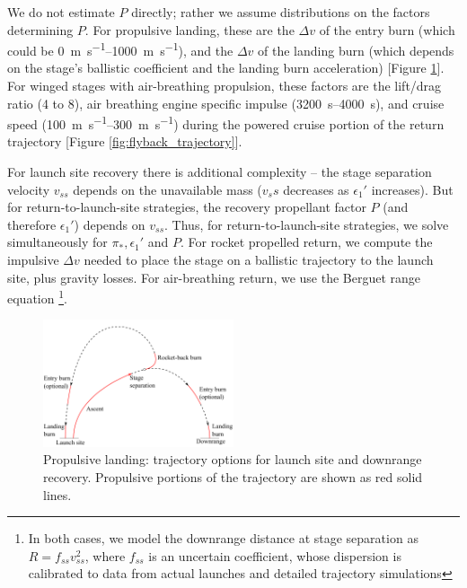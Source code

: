 \documentclass[conf]{new-aiaa}
\begin{document}
\begin{multicols}{2}
We do not estimate $P$ directly; rather we assume distributions on the factors determining $P$. For propulsive landing, these are the $\Delta v$ of the entry burn (which could be \SIrange{0}{1000}{\meter\per\second}), and the $\Delta v$ of the landing burn (which depends on the stage's ballistic coefficient and the landing burn acceleration) [Figure \ref{fig:propulsive_landing}]. For winged stages with air-breathing propulsion, these factors are the lift/drag ratio (4 to 8), air breathing engine specific impulse (\SIrange{3200}{4000}{\second}), and cruise speed (\SIrange{100}{300}{\meter\per\second}) during the powered cruise portion of the return trajectory [Figure \ref{fig:flyback_trajectory}].


For launch site recovery there is additional complexity -- the stage separation velocity $v_{ss}$ depends on the unavailable mass ($v_ss$ decreases as $\epsilon_1'$ increases). But for return-to-launch-site strategies, the recovery propellant factor $P$ (and therefore $\epsilon_1'$) depends on $v_{ss}$. Thus, for return-to-launch-site strategies, we solve simultaneously for $\pi_*, \epsilon_1'$ and $P$. For rocket propelled return, we compute the impulsive $\Delta v$ needed to place the stage on a ballistic trajectory to the launch site, plus gravity losses. For air-breathing return, we use the Berguet range equation \footnote{In both cases, we model the downrange distance at stage separation as $R = f_{ss} v_{ss}^2$, where $f_{ss}$ is an uncertain coefficient, whose dispersion is calibrated to data from actual launches and detailed trajectory simulations}.

\begin{figure}[H]
    \centering
    \includegraphics[width=0.5\textwidth]{propulsive_landing}
    \caption{\label{fig:propulsive_landing} Propulsive landing: trajectory options for launch site and downrange recovery. Propulsive portions of the trajectory are shown as red solid lines.}
\end{figure}


\end{multicols}
\end{document}
